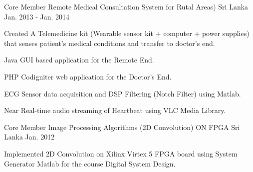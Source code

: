 


\begin{cventries}


	\cventry
		{Core Member} %
		{Remote Medical Consultation System for Rutal Areas)} %
		{Sri Lanka} %
		{Jan. 2013 - Jan. 2014} %
		{ %
			\begin{cvitems}
				\item {Created A Telemedicine kit (Wearable sensor kit + computer + power supplies) that senses patient’s medical conditions and transfer to doctor’s end.}
				\item {Java GUI based application for the Remote End.}
				\item {PHP Codigniter web application for the Doctor's End.}
				\item {ECG Sensor data acquisition and DSP Filtering (Notch Filter) using Matlab.}
				\item {Near Real-time audio streaming of Heartbeat using VLC Media Library.}
			\end{cvitems}
		}


\cventry
	{Core Member} %
	{Image Processing Algorithms (2D Convolution) ON FPGA} %
	{Sri Lanka} %
	{Jan. 2012} %
	{ %
		\begin{cvitems}
			\item {Implemented 2D Convolution on Xilinx Virtex 5 FPGA board using System Generator Matlab for the course Digital System Design.}
		\end{cvitems}
	}


\end{cventries}